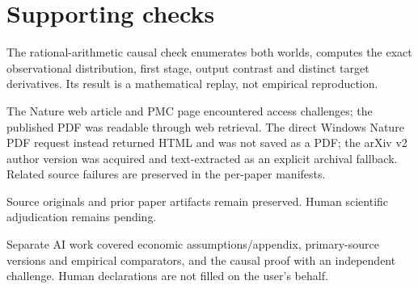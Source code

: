 \documentclass[10pt]{article}
\begin{document}
\section*{Supporting checks}
The rational-arithmetic causal check enumerates both worlds, computes the exact observational distribution, first stage, output contrast and distinct target derivatives. Its result is a mathematical replay, not empirical reproduction.\par
The Nature web article and PMC page encountered access challenges; the published PDF was readable through web retrieval. The direct Windows Nature PDF request instead returned HTML and was not saved as a PDF; the arXiv v2 author version was acquired and text-extracted as an explicit archival fallback. Related source failures are preserved in the per-paper manifests.\par
Source originals and prior paper artifacts remain preserved. Human scientific adjudication remains pending.\par
Separate AI work covered economic assumptions/appendix, primary-source versions and empirical comparators, and the causal proof with an independent challenge. Human declarations are not filled on the user’s behalf.\par
\end{document}
